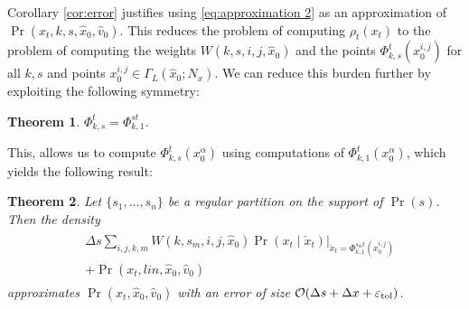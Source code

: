 \documentclass[letterpaper,10pt,conference]{ieeetran}
\newtheorem{thm}{Theorem}
\begin{document}
Corollary \ref{cor:error} justifies using \eqref{eq:approximation 2} as an approximation of $\Pr( x_t, k,s,\hat{x}_0, \hat{v}_0)$.
This reduces the problem of computing $\rho_t(x_t)$ to the problem of computing the weights $W(k,s,i,j,\hat{x}_0)$ and the points $\Phi_{k,s}^t(x_0^{i,j})$ for all $k,s$ and points $x_0^{i,j} \in \Gamma_L( \hat{x}_0; N_x)$.
We can reduce this burden further by exploiting the following symmetry:
\begin{thm} \label{thm:symmetry}
	$\Phi_{k,s}^t = \Phi_{k,1}^{st}$.
\end{thm}
This, allows us to compute $\Phi_{k,s}^t( x_0^{\alpha})$ using computations of $\Phi_{k,1}^t(x_0^{\alpha})$, which yields the following result:
\begin{thm} \label{thm:main}
	Let $\{s_1,\dots,s_n\}$ be a regular partition on the support of $\Pr(s)$.
	Then the density
	\begin{align}
		\begin{split}
		&\Delta s \sum_{i,j,k,m} W(k,s_m,i,j,\hat{x}_0) \left. \Pr( x_t \mid \check{x}_t ) \right|_{ \check{x}_t = \Phi_{k,1}^{s_m t}( x_0^{i,j}) } \\
		&+\Pr( x_t , lin, \hat{x}_0, \hat{v}_0 )
		\end{split}
		\label{eq:approximation 3}
	\end{align}
	approximates $\Pr( x_t, \hat{x}_0, \hat{v}_0)$ with an error of size $\mathcal{O}( \Delta s + \Delta x + \varepsilon_{\rm tol})$.
\end{thm}
\end{document}
